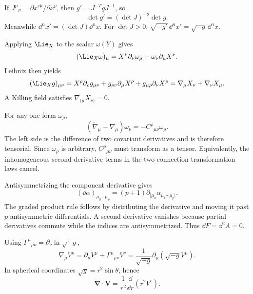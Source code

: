 \begin{exercises}


\end{exercises}

\begin{solutions}

\begin{solution}
If \(J^\mu{}_\nu=\partial x'^\mu/\partial x^\nu\), then
\(g'=J^{-T}gJ^{-1}\), so
\[
\det g'=(\det J)^{-2}\det g.
\]
Meanwhile \(\dd^nx'=(\det J)\dd^nx\).  For \(\det J>0\),
\(\sqrt{-g'}\,\dd^nx'=\sqrt{-g}\,\dd^nx\).
\end{solution}

\begin{solution}
Applying \(\Lie_X\) to the scalar \(\omega(Y)\) gives
\[
(\Lie_X\omega)_\mu
=X^\nu\partial_\nu\omega_\mu+\omega_\nu\partial_\mu X^\nu.
\]
Leibniz then yields
\[
(\Lie_Xg)_{\mu\nu}
=X^\rho\partial_\rho g_{\mu\nu}
+g_{\rho\nu}\partial_\mu X^\rho
+g_{\mu\rho}\partial_\nu X^\rho
=\nabla_\mu X_\nu+\nabla_\nu X_\mu.
\]
A Killing field satisfies \(\nabla_{(\mu}X_{\nu)}=0\).
\end{solution}

\begin{solution}
For any one-form \(\omega_\rho\),
\[
(\widetilde\nabla_\mu-\nabla_\mu)\omega_\nu
=-C^\rho{}_{\mu\nu}\omega_\rho.
\]
The left side is the difference of two covariant derivatives and is therefore
tensorial.  Since \(\omega_\rho\) is arbitrary, \(C^\rho{}_{\mu\nu}\) must
transform as a tensor.  Equivalently, the inhomogeneous second-derivative
terms in the two connection transformation laws cancel.
\end{solution}

\begin{solution}
Antisymmetrizing the component derivative gives
\[
(\dd\alpha)_{\mu_0\cdots\mu_p}
=(p+1)\partial_{[\mu_0}\alpha_{\mu_1\cdots\mu_p]}.
\]
The graded product rule follows by distributing the derivative and moving it
past \(p\) antisymmetric differentials.  A second derivative vanishes because
partial derivatives commute while the indices are antisymmetrized.  Thus
\(\dd F=\dd^2A=0\).
\end{solution}

\begin{solution}
Using
\(\Gamma^\mu{}_{\mu\nu}=\partial_\nu\ln\sqrt{-g}\),
\[
\nabla_\mu V^\mu
=\partial_\mu V^\mu+\Gamma^\mu{}_{\mu\nu}V^\nu
=\frac1{\sqrt{-g}}\partial_\mu(\sqrt{-g}V^\mu).
\]
In spherical coordinates \(\sqrt g=r^2\sin\theta\), hence
\[
\bm\nabla\cdot\bm V=\frac1{r^2}\frac{\dd}{\dd r}(r^2V^r).
\]
\end{solution}


\end{solutions}
